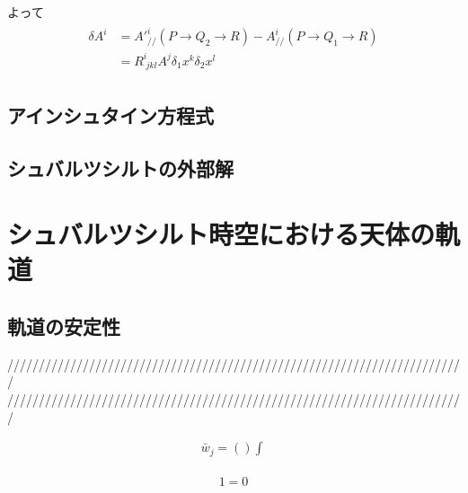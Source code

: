 \documentclass[dvipdfmx]{report} %
\begin{document}
よって
\begin{eqnarray*}
\begin{split}
	\delta A^i 
	&= 	A'^{i}_{/\!/}(P \rightarrow Q_2 \rightarrow R)
		- A^{i}_{/\!/}(P \rightarrow Q_1 \rightarrow R) \\
	&= R^{i}_{\;jkl} A^j \delta_1 x^k \delta_2 x^l
\end{split}
\end{eqnarray*}

\section{アインシュタイン方程式}


\section{シュバルツシルトの外部解}


\chapter{シュバルツシルト時空における天体の軌道}
\section{軌道の安定性}


/////////////////////////////////////////////////////////////////////////\\
/////////////////////////////////////////////////////////////////////////

\begin{equation*}
\begin{split}
	\bar{w}_j = \left( \right) \int^{}_{}
\end{split}
\end{equation*}

\begin{tcolorbox}[title=メモ用]
\begin{eqnarray*}
	1 = 0
\end{eqnarray*}
\end{tcolorbox}
\end{document}
